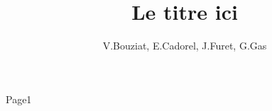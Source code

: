 \documentclass[a4paper, 11pt]{book}
\title {Le titre ici}
\author {V.Bouziat, E.Cadorel, J.Furet, G.Gas}
\begin{document}
\maketitle

Page1

\tableofcontent
\end{document}
